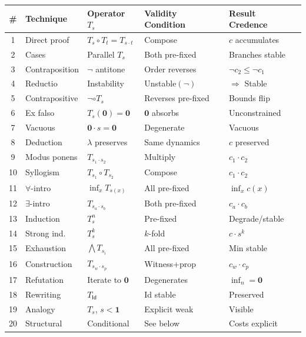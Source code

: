 \documentclass[11pt,a4paper]{article}
\newcommand{\one}{\mathbf{1}}
\newcommand{\zero}{\mathbf{0}}
\newcommand{\negc}{\neg}
\begin{document}
\begin{center}
\small
\begin{tabular}{|c|l|l|l|l|}
\hline
\textbf{\#} & \textbf{Technique} & \textbf{Operator $T_s$} & \textbf{Validity Condition} & \textbf{Result Credence} \\
\hline
1 & Direct proof & $T_s \circ T_t = T_{s \cdot t}$ & Compose & $c$ accumulates \\
2 & Cases & Parallel $T_s$ & Both pre-fixed & Branches stable \\
3 & Contraposition & $\negc$ antitone & Order reverses & $\negc c_2 \leq \negc c_1$ \\
4 & Reductio & Instability & Unstable$(\negc)$ & $\Rightarrow$ Stable \\
5 & Contrapositive & $\negc \circ T_s$ & Reverses pre-fixed & Bounds flip \\
6 & Ex falso & $T_s(\zero) = \zero$ & $\zero$ absorbs & Unconstrained \\
7 & Vacuous & $\zero \cdot s = \zero$ & Degenerate & Vacuous \\
8 & Deduction & $\lambda$ preserves & Same dynamics & $c$ preserved \\
9 & Modus ponens & $T_{s_1 \cdot s_2}$ & Multiply & $c_1 \cdot c_2$ \\
10 & Syllogism & $T_{s_1} \circ T_{s_2}$ & Compose & $c_1 \cdot c_2$ \\
11 & $\forall$-intro & $\inf_x T_{s(x)}$ & All pre-fixed & $\inf_x c(x)$ \\
12 & $\exists$-intro & $T_{s_a \cdot s_b}$ & Both pre-fixed & $c_a \cdot c_b$ \\
13 & Induction & $T_s^n$ & Pre-fixed & Degrade/stable \\
14 & Strong ind. & $T_s^k$ & $k$-fold & $c \cdot s^k$ \\
15 & Exhaustion & $\bigwedge T_{s_i}$ & All pre-fixed & Min stable \\
16 & Construction & $T_{s_w \cdot s_p}$ & Witness+prop & $c_w \cdot c_p$ \\
17 & Refutation & Iterate to $\zero$ & Degenerates & $\inf_n = \zero$ \\
18 & Rewriting & $T_{\mathsf{Id}}$ & Id stable & Preserved \\
19 & Analogy & $T_s$, $s < \one$ & Explicit weak & Visible \\
20 & Structural & Conditional & See below & Costs explicit \\
\hline
\end{tabular}
\end{center}
\end{document}
